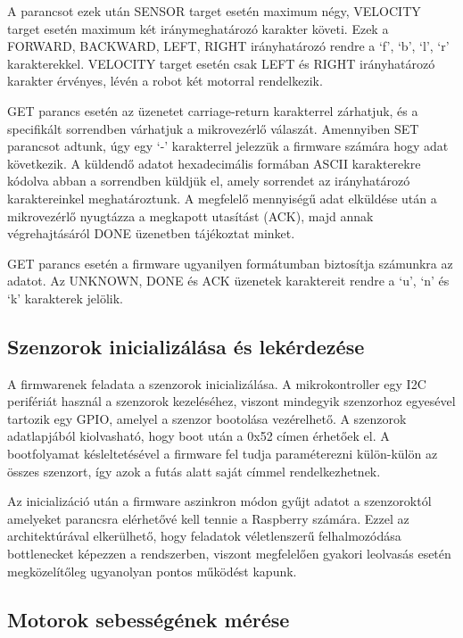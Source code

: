 A parancsot ezek után SENSOR target esetén maximum négy, VELOCITY target esetén
maximum két iránymeghatározó karakter követi. Ezek a FORWARD, BACKWARD, LEFT,
RIGHT irányhatározó rendre a `f', `b', `l', `r' karakterekkel. VELOCITY target
esetén csak LEFT és RIGHT irányhatározó karakter érvényes, lévén a robot két
motorral rendelkezik. 

GET parancs esetén az üzenetet carriage-return karakterrel zárhatjuk, és a
specifikált sorrendben várhatjuk a mikrovezérlő válaszát. Amennyiben SET
parancsot adtunk, úgy egy `-' karakterrel jelezzük a firmware számára hogy adat
következik. A küldendő adatot hexadecimális formában ASCII karakterekre kódolva
abban a sorrendben küldjük el, amely sorrendet az irányhatározó karaktereinkel
meghatároztunk. A megfelelő mennyiségű adat elküldése után a mikrovezérlő
nyugtázza a megkapott utasítást (ACK), majd annak végrehajtásáról DONE üzenetben
tájékoztat minket.

GET parancs esetén a firmware ugyanilyen formátumban biztosítja számunkra az
adatot. Az UNKNOWN, DONE és ACK üzenetek karaktereit rendre a `u', `n' és `k'
karakterek jelölik.

\medskip

\subsection{Szenzorok inicializálása és lekérdezése}

A firmwarenek feladata a szenzorok inicializálása. A mikrokontroller egy I2C
perifériát használ a szenzorok kezeléséhez, viszont mindegyik szenzorhoz
egyesével tartozik egy GPIO, amelyel a szenzor bootolása vezérelhető. A szenzorok
adatlapjából kiolvasható, hogy boot után a 0x52 címen érhetőek el. A bootfolyamat
késleltetésével a firmware fel tudja paraméterezni külön-külön az összes
szenzort, így azok a futás alatt saját címmel rendelkezhetnek.

Az inicializáció után a firmware aszinkron módon gyűjt adatot a szenzoroktól
amelyeket parancsra elérhetővé kell tennie a Raspberry számára. Ezzel az
architektúrával elkerülhető, hogy feladatok véletlenszerű felhalmozódása
bottlenecket képezzen a rendszerben, viszont megfelelően gyakori leolvasás esetén
megközelítőleg ugyanolyan pontos működést kapunk.

\subsection{Motorok sebességének mérése}

